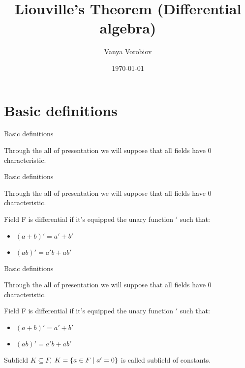 \documentclass[10pt]{beamer}
\renewcommand{\|}{\ensuremath{\hspace{0.1cm} | \hspace{0.1cm}}}
\begin{document}
    \title[Liouville's Theorem]{Liouville's Theorem (Differential algebra)}
    \author{Vanya Vorobiov}
    \date{\today}

    \begin{frame}
        \titlepage
    \end{frame}

    \section{Basic definitions}
    \begin{frame}{Basic definitions}
        \begin{remark}
            Through the all of presentation we will suppose that all fields have 0 characteristic.
        \end{remark}
    \end{frame}

    \begin{frame}{Basic definitions}
        \begin{remark}
            Through the all of presentation we will suppose that all fields have 0 characteristic.
        \end{remark}
        \begin{definition}
            Field F is differential if it's equipped the unary function $'$ such that:
            \begin{itemize}
                \item $(a+b)' = a' + b'$
                \item $(ab)' = a'b + ab'$
            \end{itemize}
        \end{definition}
    \end{frame}

    \begin{frame}{Basic definitions}
        \begin{remark}
            Through the all of presentation we will suppose that all fields have 0 characteristic.
        \end{remark}
        \begin{definition}
            Field F is differential if it's equipped the unary function $'$ such that:
            \begin{itemize}
                \item $(a+b)' = a' + b'$
                \item $(ab)' = a'b + ab'$
            \end{itemize}
        \end{definition}
        \begin{definition}
            Subfield $K\subseteq F$, $K = \{ a \in F \| a' = 0 \}$ is called subfield of constants.
        \end{definition}
    \end{frame}
    
\end{document}
